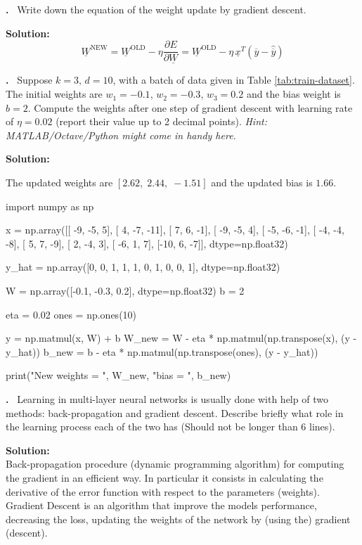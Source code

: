 \documentclass[12pt]{article}
\newcounter{problem}
\newcounter{solution}
\newcommand\Problem{%
	\stepcounter{problem}%
	\textbf{\theproblem.}~%
	\setcounter{solution}{0}%
}
\newcommand\Solution{%
	\textbf{Solution:}\\%
}
\begin{document}
\Problem{Write down the equation of the weight update by gradient descent.}

\Solution{	
	\begin{equation}
	\underline{W}^{\mathrm{NEW}}=\underline{W}^{\mathrm{OLD}}-\eta \frac{\partial E}{\partial \underline{W}}=\underline{W}^{\mathrm{OLD}}-\eta \, \underline{x}^T(\overline{y}-\hat{\overline{y}})
	\end{equation}
}

\Problem{Suppose $k = 3\mbox{, }d =10$, with a batch of data given in Table \ref{tab:train-dataset}. The initial weights are $w_1 = -0.1$, $w_2 = -0.3$, $w_3 = 0.2$ and the bias weight is $b = 2$. Compute the weights after one step of gradient descent with learning rate of $\eta = 0.02$ (report their value up to 2 decimal points). \textit{Hint: MATLAB/Octave/Python might come in handy here.}}

\Solution{
	The updated weights are $[2.62, \; 2.44, \; -1.51]$ and the updated bias is $1.66$.
	
	\begin{python}
	import numpy as np
				
	x = np.array([[ -9, -5,    5],
				   [   4, -7, -11],
				   [   7,   6,  -1],
				   [ -9, -5,    4],
				   [ -5, -6,  -1],
				   [ -4, -4,  -8],
				   [   5,   7,  -9],
				   [   2, -4,    3],
				   [ -6,   1,    7],
				   [-10,   6,  -7]], dtype=np.float32)
	
	y_hat = np.array([0, 0, 1, 1, 1, 0, 1, 0, 0, 1], dtype=np.float32)
	
	W = np.array([-0.1, -0.3, 0.2], dtype=np.float32)
	b = 2
	
	eta = 0.02
	ones = np.ones(10)
	
	y = np.matmul(x, W) + b
	W_new = W - eta * np.matmul(np.transpose(x), (y - y_hat))
	b_new = b - eta * np.matmul(np.transpose(ones), (y - y_hat))
	
	print("New weights = ", W_new, "\nNew bias = ", b_new)
	\end{python}
	
	}

\Problem{Learning in multi-layer neural networks is usually done with help of two methods: back-propagation and gradient descent. Describe briefly what role in the learning process each of the two has (Should not be longer than $6$ lines).}

\Solution{Back-propagation  procedure (dynamic programming algorithm) for computing the gradient in an efficient way. In particular it consists in calculating the derivative of the error function with respect to the parameters (weights).\\
Gradient Descent is an algorithm that improve the models performance, decreasing the loss, updating the weights of the network by (using the) gradient (descent).}
\printbibliography
\nocite{*}
\end{document}
